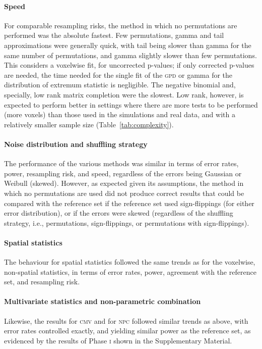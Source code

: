 \paragraph{Speed} For comparable resampling risks, the method in which no permutations are performed was the absolute fastest. Few permutations, gamma and tail approximations were generally quick, with tail being slower than gamma for the same number of permutations, and gamma slightly slower than few permutations. This considers a voxelwise fit, for uncorrected p-values; if only corrected p-values are needed, the time needed for the single fit of the \textsc{gpd} or gamma for the distribution of extremum statistic is negligible. The negative binomial and, specially, low rank matrix completion were the slowest. Low rank, however, is expected to perform better in settings where there are more tests to be performed (more voxels) than those used in the simulations and real data, and with a relatively smaller sample size (Table~\ref{tab:complexity}).

\paragraph{Noise distribution and shuffling strategy} The performance of the various methods was similar in terms of error rates, power, resampling risk, and speed, regardless of the errors being Gaussian or Weibull (skewed). However, as expected given its assumptions, the method in which no permutations are used did not produce correct results that could be compared with the reference set if the reference set used sign-flippings (for either error distribution), or if the errors were skewed (regardless of the shuffling strategy, i.e., permutations, sign-flippings, or permutations with sign-flippings).

\paragraph{Spatial statistics} The behaviour for spatial statistics followed the same trends as for the voxelwise, non-spatial statistics, in terms of error rates, power, agreement with the reference set, and resampling risk.

\paragraph{Multivariate statistics and non-parametric combination} Likewise, the results for \textsc{cmv} and for \textsc{npc} followed similar trends as above, with error rates controlled exactly, and yielding similar power as the reference set, as evidenced by the results of Phase \textsc{i} shown in the Supplementary Material.

